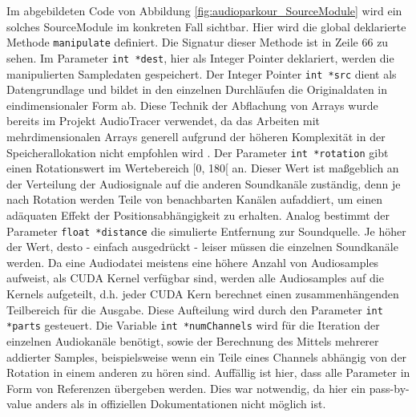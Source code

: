 Im abgebildeten Code von Abbildung \ref{fig:audioparkour_SourceModule} wird ein solches SourceModule im konkreten Fall sichtbar. Hier wird die global deklarierte Methode \texttt{manipulate} definiert. Die Signatur dieser Methode ist in Zeile 66 zu sehen. Im Parameter \texttt{int *dest}, hier als Integer Pointer deklariert, werden die manipulierten Sampledaten gespeichert. Der Integer Pointer \texttt{int *src} dient als Datengrundlage und bildet in den einzelnen Durchläufen die Originaldaten in eindimensionaler Form ab. Diese Technik der Abflachung von Arrays wurde bereits im Projekt AudioTracer verwendet, da das Arbeiten mit mehrdimensionalen Arrays generell aufgrund der höheren Komplexität in der Speicherallokation nicht empfohlen wird \cite{nvidia_docs_best_practice}. Der Parameter \texttt{int *rotation} gibt einen Rotationswert im Wertebereich [0, 180[ an. Dieser Wert ist maßgeblich an der Verteilung der Audiosignale auf die anderen Soundkanäle zuständig, denn je nach Rotation werden Teile von benachbarten Kanälen aufaddiert, um einen adäquaten Effekt der Positionsabhängigkeit zu erhalten. Analog bestimmt der Parameter \texttt{float *distance} die simulierte Entfernung zur Soundquelle. Je höher der Wert, desto - einfach ausgedrückt - leiser müssen die einzelnen Soundkanäle werden. Da eine Audiodatei meistens eine höhere Anzahl von Audiosamples aufweist, als CUDA Kernel verfügbar sind, werden alle Audiosamples auf die Kernels aufgeteilt, d.h. jeder CUDA Kern berechnet einen zusammenhängenden Teilbereich für die Ausgabe. Diese Aufteilung wird durch den Parameter \texttt{int *parts} gesteuert. Die Variable \texttt{int *numChannels} wird für die Iteration der einzelnen Audiokanäle benötigt, sowie der Berechnung des Mittels mehrerer addierter Samples, beispielsweise wenn ein Teile eines Channels abhängig von der Rotation in einem anderen zu hören sind.
Auffällig ist hier, dass alle Parameter in Form von Referenzen übergeben werden. Dies war notwendig, da hier ein pass-by-value anders als in offiziellen Dokumentationen \cite{pycuda_docs} nicht möglich ist.

